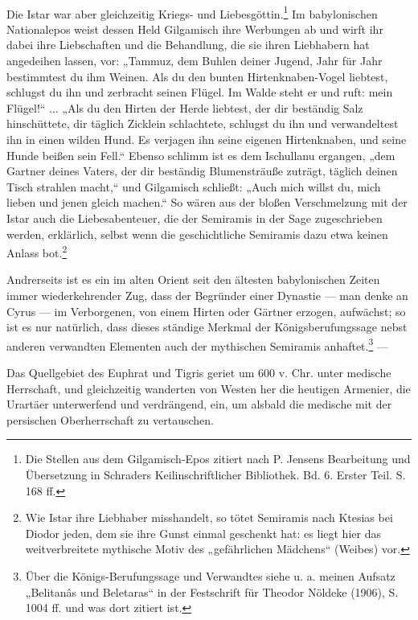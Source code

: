 \documentclass[a4paper, 11pt, oneside, polutonikogreek, german]{article}
\begin{document}
\paragraph{}
Die Istar war aber gleichzeitig Kriegs- und Liebesgöttin.\footnote{Die Stellen aus dem Gilgamisch-Epos zitiert nach P. Jensens Bearbeitung und Übersetzung in Schraders Keilinschriftlicher Bibliothek. Bd. 6. Erster Teil. S. 168 ff.} Im babylonischen Nationalepos weist dessen Held Gilgamisch ihre Werbungen ab und wirft ihr dabei ihre Liebschaften und die Behandlung, die sie ihren Liebhabern hat angedeihen lassen, vor: „Tammuz, dem Buhlen deiner Jugend, Jahr für Jahr bestimmtest du ihm Weinen. Als du den bunten Hirtenknaben-Vogel liebtest, schlugst du ihn und zerbracht seinen Flügel. Im Walde steht er und ruft: mein Flügel!“ ... „Als du den Hirten der Herde liebtest, der dir beständig Salz hinschüttete, dir täglich Zicklein schlachtete, schlugst du ihn und verwandeltest ihn in einen wilden Hund. Es verjagen ihn seine eigenen Hirtenknaben, und seine Hunde beißen sein Fell.“ Ebenso schlimm ist es dem Ischullanu ergangen, „dem Gartner deines Vaters, der dir beständig Blumensträuße zuträgt, täglich deinen Tisch strahlen macht,“ und Gilgamisch schließt: „Auch mich willst du, mich lieben und jenen gleich machen.“ So wären aus der bloßen Verschmelzung mit der Istar auch die Liebesabenteuer, die der Semiramis in der Sage zugeschrieben werden, erklärlich, selbst wenn die geschichtliche Semiramis dazu etwa keinen Anlass bot.\footnote{Wie Istar ihre Liebhaber misshandelt, so tötet Semiramis nach Ktesias bei Diodor jeden, dem sie ihre Gunst einmal geschenkt hat: es liegt hier das weitverbreitete mythische Motiv des „gefährlichen Mädchens“ (Weibes) vor.}

Andrerseits ist es ein im alten Orient seit den ältesten babylonischen Zeiten immer wiederkehrender Zug, dass der Begründer einer Dynastie --- man denke an Cyrus --- im Verborgenen, von einem Hirten oder Gärtner erzogen, aufwächst; so ist es nur natürlich, dass dieses ständige Merkmal der Königsberufungssage nebst anderen verwandten Elementen auch der mythischen Semiramis anhaftet.\footnote{Über die Königs-Berufungssage und Verwandtes siehe u. a. meinen Aufsatz „Belitanâs und Beletaras“ in der Festschrift für Theodor Nöldeke (1906), S. 1004 ff. und was dort zitiert ist.} ---

Das Quellgebiet des Euphrat und Tigris geriet um 600 v. Chr. unter medische Herrschaft, und gleichzeitig wanderten von Westen her die heutigen Armenier, die Urartäer unterwerfend und verdrängend, ein, um alsbald die medische mit der persischen Oberherrschaft zu vertauschen.
\end{document}
